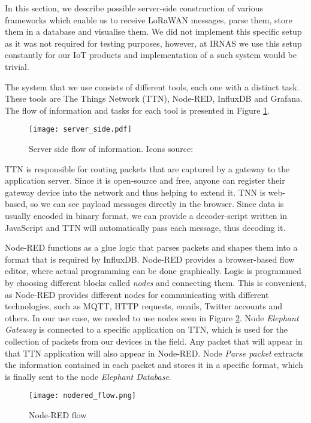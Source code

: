 In this section, we describe possible server-side construction of various frameworks which enable us to receive LoRaWAN messages, parse them, store them in a database and visualise them.
We did not implement this specific setup as it was not required for testing purposes, however, at IRNAS we use this setup constantly for our IoT products and implementation of a such system would be trivial.

The system that we use consists of different tools, each one with a distinct task.
These tools are The Things Network (TTN), Node-RED, InfluxDB and Grafana.
The flow of information and tasks for each tool is presented in Figure \ref{server_side}.

\begin{figure}[ht]
    \centering
    \texttt{[image: server\_side.pdf]} 
    \caption[Server side flow of information.]{Server side flow of information. Icons source:\cite{icons}}
    \label{server_side}
\end{figure}

TTN is responsible for routing packets that are captured by a gateway to the application server.
Since it is open-source and free, anyone can register their gateway device into the network and thus helping to extend it.
TNN is web-based, so we can see payload messages directly in the browser.
Since data is usually encoded in binary format, we can provide a decoder-script written in JavaScript and TTN will automatically pass each message, thus decoding it.

Node-RED functions as a glue logic that parses packets and shapes them into a format that is required by InfluxDB.
Node-RED provides a browser-based flow editor, where actual programming can be done graphically.
Logic is programmed by choosing different blocks called \textit{nodes} and connecting them.
This is convenient, as Node-RED provides different nodes for communicating with different technologies, such as MQTT, HTTP requests, emails, Twitter accounts and others.
In our use case, we needed to use nodes seen in Figure \ref{nodered_flow}.
Node \textit{Elephant Gateway} is connected to a specific application on TTN, which is used for the collection of packets from our devices in the field.
Any packet that will appear in that TTN application will also appear in Node-RED.
Node \textit{Parse packet} extracts the information contained in each packet and stores it in a specific format, which is finally sent to the node \textit{Elephant Database}.

\begin{figure}[ht]
    \centering
    \texttt{[image: nodered\_flow.png]} 
    \caption{ Node-RED flow}
    \label{nodered_flow}
\end{figure}

